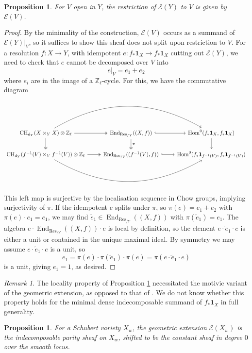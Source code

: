 \documentclass[11pt]{article}
\DeclareMathOperator{\Hom}{Hom}
\DeclareMathOperator{\End}{End}
\DeclareMathOperator{\CH}{\mathrm{CH}}
\newtheorem{prop}[thm]{Proposition}
\theoremstyle{remark}
\newtheorem{rem}[thm]{Remark}
\theoremstyle{definition}
\begin{document}
\begin{prop}\label{prop:locality of geo ext}
    For $V$ open in $Y$, the restriction of $\mathscr{E}(Y)$ to $V$ is given by $\mathscr{E}(V)$.
\end{prop}
\begin{proof}
    By the minimality of the construction,  $\mathscr{E}(V)$ occurs as a summand of $\mathscr{E}(Y)|_V$, so it suffices to show this sheaf does not split upon restriction to $V$. For a resolution $f:X\to Y$, with idempotent $e:f_*\mathbf{1}_X\to f_*\mathbf{1}_X$ cutting out $\mathscr{E}(Y)$, we need to check that $e$ cannot be decomposed over $V$ into \[e|_V=e_1+e_2\] where $e_i$ are in the image of a $\mathbb{Z}_\ell$-cycle. For this, we have the commutative diagram \[\begin{tikzcd} \CH_{d_Y}(X\times_Y X)\otimes \mathbb{Z}_\ell\arrow[rr,bend left]\arrow[d,two heads]\arrow[r,two heads]&\End_{\text{Res}{_{/Y}}}((X,f))\arrow[r,hook]\arrow[d,"\pi",two heads]&\Hom^0(f_*\mathbf{1}_X,f_*\mathbf{1}_X)\arrow[d]\\
    \CH_{d_Y}(f^{-1}(V)\times_Vf^{-1}(V))\otimes \mathbb{Z}_\ell\arrow[rr,bend right]\arrow[r,two heads]&\End_{\text{Res}{_{/V}}}((f^{-1}(V),f))\arrow[r,hook]&\Hom^0(f_*\mathbf{1}_{f^{-1}(V)},f_*\mathbf{1}_{f^{-1}(V)})
    \end{tikzcd}\] This left map is surjective by the localisation sequence in Chow groups, implying surjectivity of $\pi$. If the idempotent $e$ splits under $\pi$, so $\pi(e)=e_1+e_2$ with $\pi(e)\cdot e_1=e_1$, we may find $\tilde{e}_1\in \End_{\text{Res}{_{/Y}}}((X,f))$ with $\pi(\tilde{e}_1)=e_1$. The algebra $e\cdot \End_{\text{Res}{_{/Y}}}((X,f))\cdot e$ is local by definition, so the element $e\cdot \tilde{e}_1\cdot e$ is either a unit or contained in the unique maximal ideal. By symmetry we may assume $e\cdot \tilde{e}_1\cdot e$ is a unit, so \[e_1=\pi(e)\cdot \pi(\tilde{e}_1)\cdot \pi(e)=\pi(e\cdot \tilde{e}_1\cdot e)\] is a unit, giving $e_1=1$, as desired.
\end{proof}

\begin{rem}
The locality property of Proposition \ref{prop:locality of geo ext} necessitated the motivic variant of the geometric extension, as opposed to that of \cite{HW23, McN18}. We do not know whether this property holds for the minimal dense indecomposable summand of $f_*\mathbf{1}_X$ in full generality.
\end{rem}

\begin{prop}\label{prop:geo is parity}
For a Schubert variety $X_w$, the geometric extension $\mathscr{E}(X_w)$ is the indecomposable parity sheaf on $X_w$, shifted to be the constant sheaf in degree $0$ over the smooth locus.
\end{prop}
\end{document}
